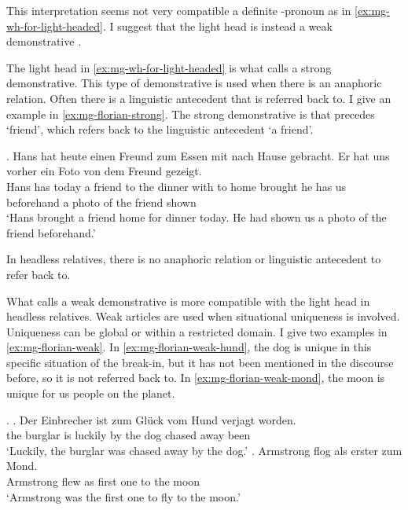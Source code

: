 This interpretation seems not very compatible a definite -pronoun as  in \ref{ex:mg-wh-for-light-headed}. I suggest that the light head is instead a weak demonstrative \citep{schwarz2009}.

The light head in \ref{ex:mg-wh-for-light-headed} is what \citet{schwarz2009} calls a strong demonstrative. This type of demonstrative is used when there is an anaphoric relation. Often there is a linguistic antecedent that is referred back to. I give an example in \ref{ex:mg-florian-strong}. The strong demonstrative is  that precedes  `friend', which refers back to the linguistic antecedent  `a friend'.

\exg. Hans hat heute einen Freund zum Essen mit nach Hause gebracht. Er hat uns vorher ein Foto von dem Freund gezeigt.\\
Hans has today a friend {to the} dinner with to home brought he has us beforehand a photo of the friend shown\\
`Hans brought a friend home for dinner today. He had shown us a photo of the friend beforehand.'\label{ex:mg-florian-strong}

In headless relatives, there is no anaphoric relation or linguistic antecedent to refer back to.

What \citet{schwarz2009} calls a weak demonstrative is more compatible with the light head in headless relatives. Weak articles are used when situational uniqueness is involved. Uniqueness can be global or within a restricted domain. I give two examples in \ref{ex:mg-florian-weak}. In \ref{ex:mg-florian-weak-hund}, the dog is unique in this specific situation of the break-in, but it has not been mentioned in the discourse before, so it is not referred back to. In \ref{ex:mg-florian-weak-mond}, the moon is unique for us people on the planet.

\ex.\label{ex:mg-florian-weak}
\ag. Der Einbrecher ist {zum Glück} vom Hund verjagt worden.\\
the burglar is luckily {by the} dog {chased away} been\\
`Luckily, the burglar was chased away by the dog.'\label{ex:mg-florian-weak-hund}
\bg. Armstrong flog als erster zum Mond.\\
Armstrong flew as {first one} {to the} moon\\
`Armstrong was the first one to fly to the moon.' \label{ex:mg-florian-weak-mond}

